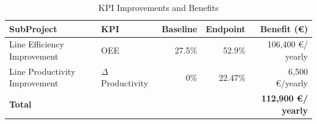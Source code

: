\begin{table}[ht]
\centering
\renewcommand{\arraystretch}{1.3}
\begin{tabular}{l l r r r}
\hline
\textbf{SubProject} & \textbf{KPI} & \textbf{Baseline} & \textbf{Endpoint} & \textbf{Benefit (\euro)} \\
\hline
Line Efficiency Improvement & OEE & 27.5\% & 52.9\% & 106,400 \euro / yearly \\
Line Productivity Improvement & $\Delta$ Productivity & 0\% & 22.47\% & 6,500 \euro /yearly \\
\hline
\textbf{Total} & & & & \textbf{112,900 \euro / yearly} \\
\hline
\end{tabular}
\caption{KPI Improvements and Benefits}
\label{tab:kpi_benefits}
\end{table}

